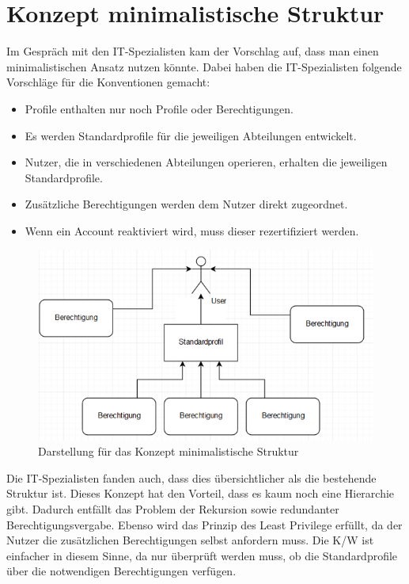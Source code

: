\section{Konzept minimalistische Struktur}
\label{sec:chapter04:minimal}
Im Gespräch mit den IT-Spezialisten kam der Vorschlag auf, dass man einen minimalistischen Ansatz nutzen könnte.
Dabei haben die IT-Spezialisten folgende Vorschläge für die Konventionen gemacht:
\newline
\begin{itemize}
	\item Profile enthalten nur noch Profile oder Berechtigungen.
	\item Es werden Standardprofile für die jeweiligen Abteilungen entwickelt.
	\item Nutzer, die in verschiedenen Abteilungen operieren, erhalten die jeweiligen Standardprofile.
	\item Zusätzliche Berechtigungen werden dem Nutzer direkt zugeordnet.
	\item Wenn ein Account reaktiviert wird, muss dieser rezertifiziert werden.
\end{itemize}
\begin{figure}[h!]
 \centering
 \includegraphics[width=1\textwidth]{gfx/Picture/Minimal.PNG}
 \caption{Darstellung für das Konzept minimalistische Struktur}
 \label{fig:Min}
\end{figure}
Die IT-Spezialisten fanden auch, dass dies übersichtlicher als die bestehende Struktur ist.
Dieses Konzept hat den Vorteil, dass es kaum noch eine Hierarchie gibt.
Dadurch entfällt das Problem der Rekursion sowie redundanter Berechtigungsvergabe.
Ebenso wird das Prinzip des Least Privilege erfüllt, da der Nutzer die zusätzlichen Berechtigungen selbst anfordern muss.
Die \ac{K/W} ist einfacher in diesem Sinne, da nur überprüft werden muss, ob die Standardprofile über die notwendigen Berechtigungen verfügen.
